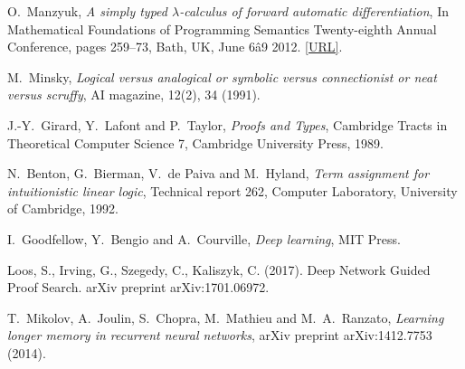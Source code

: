 \documentclass[english,letter paper,12pt,leqno]{article}
\theoremstyle{example}
\numberwithin{equation}{section}
\begin{document}
\begin{thebibliography}{BHLS03}
O.~Manzyuk, \textsl{A simply typed $\lambda$-calculus of forward automatic differentiation}, In Mathematical Foundations of Programming Semantics Twenty-eighth Annual Conference, pages 259--73, Bath, UK, June 6â9 2012. \href{http://dauns.math.tulane.edu/~mfps/mfps28proc.pdf}{[URL]}.

M.~Minsky, \textsl{Logical versus analogical or symbolic versus connectionist or neat versus scruffy}, AI magazine, 12(2), 34 (1991).

J.-Y.~Girard, Y.~Lafont and P.~Taylor, \textsl{Proofs and Types}, Cambridge Tracts in Theoretical Computer Science 7, Cambridge University Press, 1989.

N.~Benton, G.~Bierman, V.~de Paiva and M.~Hyland, \textsl{Term assignment for intuitionistic linear logic}, Technical report 262, Computer Laboratory, University of Cambridge, 1992.

I.~Goodfellow, Y.~Bengio and A.~Courville, \textsl{Deep learning}, MIT Press.

Loos, S., Irving, G., Szegedy, C., Kaliszyk, C. (2017). Deep Network Guided Proof Search. arXiv preprint arXiv:1701.06972.

T.~Mikolov, A.~Joulin, S.~Chopra, M.~Mathieu and M.~A.~Ranzato, \textsl{Learning longer memory in recurrent neural networks}, arXiv preprint arXiv:1412.7753 (2014). 

\end{thebibliography}
\end{document}
